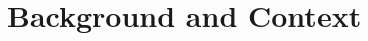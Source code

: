 \documentclass[../main.tex]{subfiles}
\begin{document}
\section{Background and Context}
\clearpage
\end{document}
